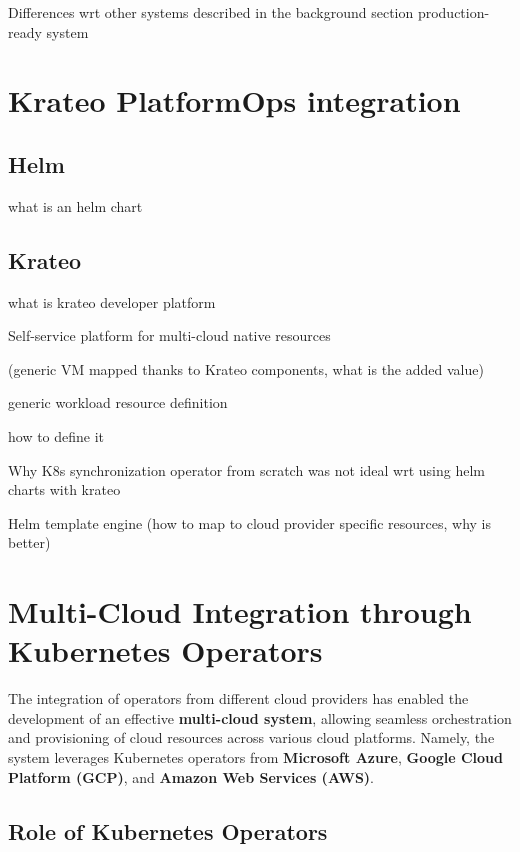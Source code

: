 Differences wrt other systems described in the background section
production-ready system





\section{Krateo PlatformOps integration}

\subsection{Helm}
what is an helm chart


\subsection{Krateo}
what is krateo
developer platform


Self-service platform for multi-cloud native resources



(generic VM mapped thanks to Krateo components, what is the added value)




generic workload resource definition


how to define it

Why K8s synchronization operator from scratch was not ideal wrt using helm charts with krateo

Helm template engine (how to map to cloud provider specific resources, why is better)







\section{Multi-Cloud Integration through Kubernetes Operators}

The integration of operators from different cloud providers has enabled the development of an effective \textbf{multi-cloud system}, allowing seamless orchestration and provisioning of cloud resources across various cloud platforms. Namely, the system leverages Kubernetes operators from \textbf{Microsoft Azure}, \textbf{Google Cloud Platform (GCP)}, and \textbf{Amazon Web Services (AWS)}.

\subsection{Role of Kubernetes Operators}

